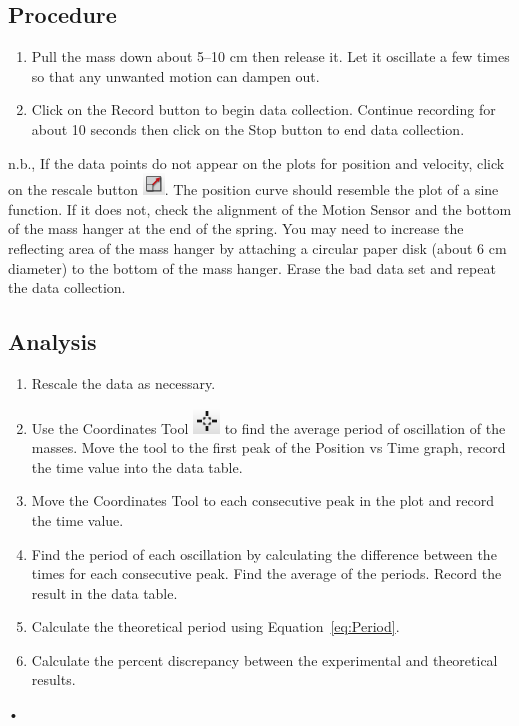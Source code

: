 \documentclass[main.tex]{subfiles}
\begin{document}
\subsection*{Procedure}
\begin{enumerate}
\item
Pull the mass down about 5--10 cm then release it. Let it oscillate a few times so that any unwanted motion can dampen out.
\item
Click on the Record button to begin data collection. Continue recording for about 10 seconds then click on the Stop button to end data collection.
\end{enumerate}
n.b., If the data points do not appear on the plots for position and velocity, click on the rescale button \includegraphics{Rescale}. The position curve should resemble the plot of a sine function. If it does not, check the alignment of the Motion Sensor and the bottom of the mass hanger at the end of the spring. You may need to increase the reflecting area of the mass hanger by attaching a circular paper disk (about 6 cm diameter) to the bottom of the mass hanger. Erase the bad data set and repeat the data collection.

\subsection*{Analysis}
\begin{enumerate}
\item
Rescale the data as necessary.
\item
Use the Coordinates Tool \includegraphics{Coordinates_Tool} to find the average period of oscillation of the masses. Move the tool to the first peak of the Position vs Time graph, record the time value into the data table.
\item
Move the Coordinates Tool to each consecutive peak in the plot and record the time value.
\item
Find the period of each oscillation by calculating the difference between the times for each consecutive peak. Find the average of the periods. Record the result in the data table.
\item
Calculate the theoretical period using Equation~\eqref{eq:Period}.
\item
Calculate the percent discrepancy between the experimental and theoretical results.
\end{enumerate}•
\end{document}
